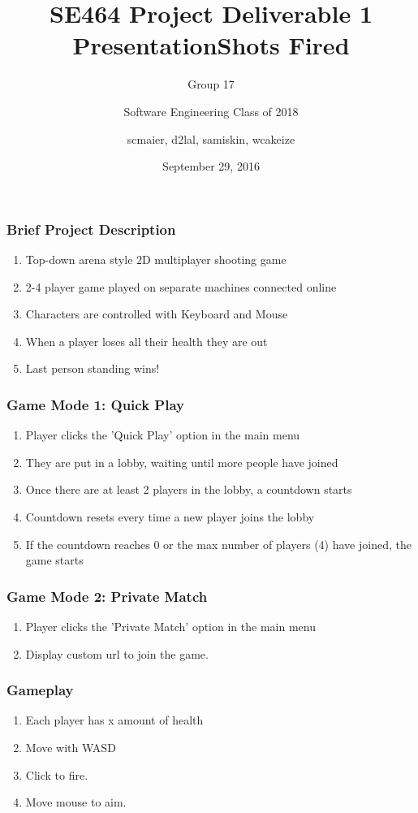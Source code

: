 \documentclass{beamer}
\title%
{SE464 Project Deliverable 1 Presentation}
\subtitle{Group 17}
\author[SE2018] %
{Software Engineering Class of 2018}
\institute[UW] %
{
  University of Waterloo
}
\date%
{September 29, 2016}
\title{Shots Fired}
\author{scmaier, d2lal, samiskin, wcakeize}
\begin{document}
\maketitle
\begin{frame}
\frametitle{Brief Project Description}
\begin{enumerate}
  \item Top-down arena style 2D multiplayer shooting game
  \item 2-4 player game played on separate machines connected online
  \item Characters are controlled with Keyboard and Mouse
  \item When a player loses all their health they are out
  \item Last person standing wins!
\end{enumerate}
\end{frame}

\begin{frame}
\frametitle{Game Mode 1: Quick Play}
\begin{enumerate}
  \item Player clicks the 'Quick Play' option in the main menu
  \item They are put in a lobby, waiting until more people have joined
  \item Once there are at least 2 players in the lobby, a countdown starts
  \item Countdown resets every time a new player joins the lobby
  \item If the countdown reaches 0 or the max number of players (4) have joined, the game starts
\end{enumerate}
\end{frame}

\begin{frame}
\frametitle{Game Mode 2: Private Match}
\begin{enumerate}
  \item Player clicks the 'Private Match' option in the main menu
  \item Display custom url to join the game.
\end{enumerate}
\end{frame}

\begin{frame}
\frametitle{Gameplay}
\begin{enumerate}
  \item Each player has x amount of health
  \item Move with WASD
  \item Click to fire.
  \item Move mouse to aim.
\end{enumerate}
\end{frame}
\end{document}
